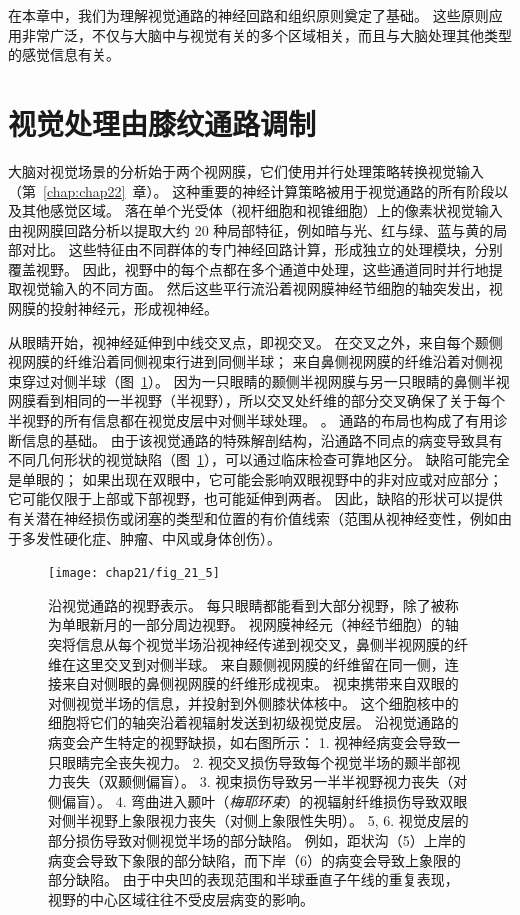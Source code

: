 在本章中，我们为理解视觉通路的神经回路和组织原则奠定了基础。
这些原则应用非常广泛，不仅与大脑中与视觉有关的多个区域相关，而且与大脑处理其他类型的感觉信息有关。



\section{视觉处理由膝纹通路调制}

大脑对视觉场景的分析始于两个视网膜，它们使用并行处理策略转换视觉输入（第~\ref{chap:chap22}~章）。
这种重要的神经计算策略被用于视觉通路的所有阶段以及其他感觉区域。
落在单个光受体（视杆细胞和视锥细胞）上的像素状视觉输入由视网膜回路分析以提取大约 20 种局部特征，例如暗与光、红与绿、蓝与黄的局部对比。
这些特征由不同群体的专门神经回路计算，形成独立的处理模块，分别覆盖视野。
因此，视野中的每个点都在多个通道中处理，这些通道同时并行地提取视觉输入的不同方面。
然后这些平行流沿着视网膜神经节细胞的轴突发出，视网膜的投射神经元，形成视神经。


从眼睛开始，视神经延伸到中线交叉点，即视交叉。
在交叉之外，来自每个颞侧视网膜的纤维沿着同侧视束行进到同侧半球；
来自鼻侧视网膜的纤维沿着对侧视束穿过对侧半球（图~\ref{fig:21_5}）。
因为一只眼睛的颞侧半视网膜与另一只眼睛的鼻侧半视网膜看到相同的一半视野（半视野），所以交叉处纤维的部分交叉确保了关于每个半视野的所有信息都在视觉皮层中对侧半球处理。 。
通路的布局也构成了有用诊断信息的基础。
由于该视觉通路的特殊解剖结构，沿通路不同点的病变导致具有不同几何形状的视觉缺陷（图~\ref{fig:21_5}），可以通过临床检查可靠地区分。
缺陷可能完全是单眼的；
如果出现在双眼中，它可能会影响双眼视野中的非对应或对应部分；
它可能仅限于上部或下部视野，也可能延伸到两者。
因此，缺陷的形状可以提供有关潜在神经损伤或闭塞的类型和位置的有价值线索（范围从视神经变性，例如由于多发性硬化症、肿瘤、中风或身体创伤）。


\begin{figure}[htbp]
	\centering
	\texttt{[image: chap21/fig\_21\_5]}
	\caption{沿视觉通路的视野表示。
		每只眼睛都能看到大部分视野，除了被称为单眼新月的一部分周边视野。
		视网膜神经元（神经节细胞）的轴突将信息从每个视觉半场沿视神经传递到视交叉，鼻侧半视网膜的纤维在这里交叉到对侧半球。
		来自颞侧视网膜的纤维留在同一侧，连接来自对侧眼的鼻侧视网膜的纤维形成视束。
		视束携带来自双眼的对侧视觉半场的信息，并投射到外侧膝状体核中。
		这个细胞核中的细胞将它们的轴突沿着视辐射发送到初级视觉皮层。
		沿视觉通路的病变会产生特定的视野缺损，如右图所示：
		1. 视神经病变会导致一只眼睛完全丧失视力。
		2. 视交叉损伤导致每个视觉半场的颞半部视力丧失（双颞侧偏盲）。
		3. 视束损伤导致另一半半视野视力丧失（对侧偏盲）。
		4. 弯曲进入颞叶（\textit{梅耶环束}）的视辐射纤维损伤导致双眼对侧半视野上象限视力丧失（对侧上象限性失明）。
		5, 6. 视觉皮层的部分损伤导致对侧视觉半场的部分缺陷。
		例如，距状沟（5）上岸的病变会导致下象限的部分缺陷，而下岸（6）的病变会导致上象限的部分缺陷。 由于中央凹的表现范围和半球垂直子午线的重复表现，视野的中心区域往往不受皮层病变的影响。}
	\label{fig:21_5}
\end{figure}


